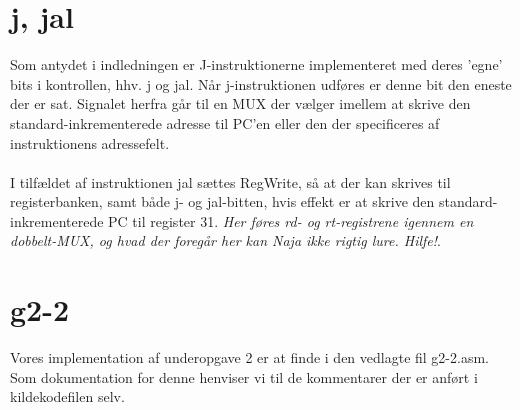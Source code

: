 \documentclass[10pt,a4paper,danish]{article}
\begin{document}
\section{j, jal}
Som antydet i indledningen er J-instruktionerne implementeret med deres 'egne'
bits i kontrollen, hhv. j og jal. Når j-instruktionen udføres er denne bit den
eneste der er sat. Signalet herfra går til en MUX der vælger imellem at skrive
den standard-inkrementerede adresse til PC'en eller den der specificeres af
instruktionens adressefelt. 

\paragraph{}
I tilfældet af instruktionen jal sættes RegWrite, så at der kan skrives til
registerbanken, samt både j- og jal-bitten, hvis effekt er at skrive den
standard-inkrementerede PC til register 31. \emph{Her føres rd- og rt-registrene
igennem en dobbelt-MUX, og hvad der foregår her kan Naja ikke rigtig lure.
Hilfe!}.

\section{g2-2}
Vores implementation af underopgave 2 er at finde i den vedlagte fil g2-2.asm.
Som dokumentation for denne henviser vi til de kommentarer der er anført i
kildekodefilen selv. 
\end{document}
